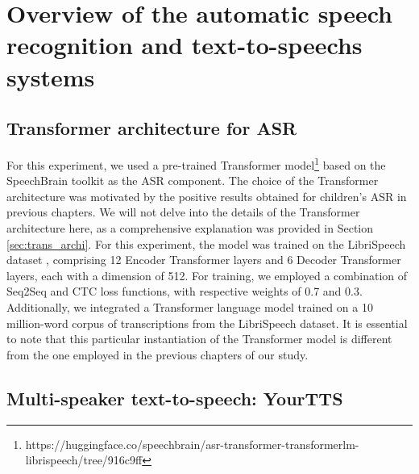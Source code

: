 \section{Overview of the automatic speech recognition and text-to-speechs systems}
\label{section:SOA}
\subsection{Transformer architecture for ASR}

For this experiment, we used a pre-trained Transformer model\footnote{https://huggingface.co/speechbrain/asr-transformer-transformerlm-librispeech/tree/916c9ff} based on the SpeechBrain toolkit \cite{speechbrain} as the \ac{ASR} component. The choice of the Transformer architecture was motivated by the positive results obtained for children's \ac{ASR} in previous chapters. We will not delve into the details of the Transformer architecture here, as a comprehensive explanation was provided in Section \ref{sec:trans_archi}. For this experiment, the model was trained on the LibriSpeech dataset \cite{librispeech}, comprising 12 Encoder Transformer layers and 6 Decoder Transformer layers, each with a dimension of 512. For training, we employed a combination of \ac{Seq2Seq} and \ac{CTC} loss functions, with respective weights of 0.7 and 0.3. Additionally, we integrated a Transformer language model trained on a 10 million-word corpus of transcriptions from the LibriSpeech dataset.
It is essential to note that this particular instantiation of the Transformer model is different from the one employed in the previous chapters of our study. 


\subsection{Multi-speaker text-to-speech: YourTTS}

